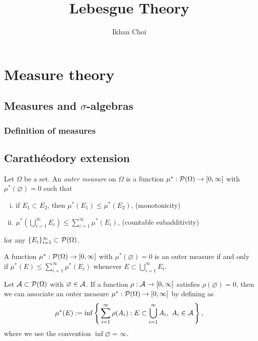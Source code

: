 \documentclass{../note}
\begin{document}
\title{Lebesgue Theory}
\author{Ikhan Choi}
\maketitle
\tableofcontents

\part{Measure theory}



\chapter{Measures and $\sigma$-algebras}

\section{Definition of measures}



\chapter{Carath\'eodory extension}

\begin{prb}
Let $\Omega$ be a set.
An \emph{outer measure} on $\Omega$ is a function $\mu^*:\mathcal{P}(\Omega)\to[0,\infty]$ with $\mu^*(\varnothing)=0$ such that
\begin{enumerate}[(i)]
\item if $E_1\subset E_2$, then $\mu^*(E_1)\le\mu^*(E_2)$,
\hfill(monotonicity)
\item $\mu^*(\bigcup_{i=1}^\infty E_i)\le\sum_{i=1}^\infty\mu^*(E_i)$,
\hfill(countable subadditivity)
\end{enumerate}
for any $\{E_i\}_{i=1}^\infty\subset\mathcal{P}(\Omega)$.
\begin{parts}
\item A function $\mu^*:\mathcal{P}(\Omega)\to[0,\infty]$ with $\mu^*(\varnothing)=0$ is an outer measure if and only if $\mu^*(E)\le\sum_{i=1}^\infty\mu^*(E_i)$ whenever $E\subset\bigcup_{i=1}^\infty E_i$.
\item
Let $\mathcal{A}\subset\mathcal{P}(\Omega)$ with $\varnothing\in\mathcal{A}$.
If a function $\rho:\mathcal{A}\to[0,\infty]$ satisfies $\rho(\varnothing)=0$, then we can associate an outer measure $\mu^*:\mathcal{P}(\Omega)\to[0,\infty]$ by defining as
\[\mu^*(E):=\inf\left\{\,\sum_{i=1}^\infty\rho(A_i):E\subset\bigcup_{i=1}^\infty A_i,\ A_i\in\mathcal{A}\,\right\},\]
where we use the convention $\inf\varnothing=\infty$.
\end{parts}
\end{prb}
\end{document}
